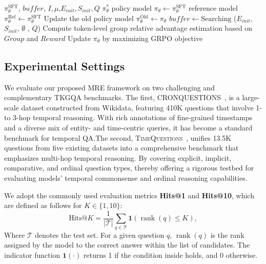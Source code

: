 \documentclass[letterpaper]{article} %
\begin{document}
\begin{algorithm}
\caption{Single sample in Tree-Group Relative Policy Optimization}
\label{alg:Train-TGRPO}
\begin{algorithmic}[1]
\Require $\pi_{\theta}^\mathrm{SFT}$, $buf\!fer$, $I, \mu$,$E_{init},S_{init},Q$
\Ensure $\pi_\theta^{*}$
\State policy model $\pi_\theta \leftarrow \pi_{\theta}^\mathrm{SFT}$
\State reference model $ \pi_{\theta}^\mathrm{Ref} \leftarrow \pi_{\theta}^\mathrm{SFT}$
\State            Update the old policy model $\pi_{\theta}^\mathrm{Old}\leftarrow \pi_\theta$
 \State           $buf\!fer \gets \text{Searching}$ ($E_{init}$, $S_{init}$, $\emptyset$ , $Q$)
 \State            Compute token-level group relative advantage estimation based on $Group$ and $Reward$
  \State Update $\pi_\theta$ by maximizing GRPO objective 
 \EndFor
 \EndFor
\EndFor
\end{algorithmic}
\end{algorithm}



\subsection{Experimental Settings}
We evaluate our proposed MRE framework on two challenging and complementary TKGQA benchmarks. The first, \textsc{CRONQUESTIONS}~\cite{cronqa}, is a large-scale dataset constructed from Wikidata, featuring 410K questions that involve 1- to 3-hop temporal reasoning. With rich annotations of fine-grained timestamps and a diverse mix of entity- and time-centric queries, it has become a standard benchmark for temporal QA.The second, \textsc{TimeQuestions}~\cite{TwiRGCN}, unifies 13.5K questions from five existing datasets into a comprehensive benchmark that emphasizes multi-hop temporal reasoning. By covering explicit, implicit, comparative, and ordinal question types, thereby offering a rigorous testbed for evaluating models' temporal commonsense and ordinal reasoning capabilities.




We adopt the commonly used evaluation metrics \textbf{Hits@1} and \textbf{Hits@10}, which are defined as follows for $K \in \{1, 10\}$:
\begin{equation}
\text{Hits@}K = \frac{1}{|\mathcal{T}|} \sum_{q \in \mathcal{T}} \mathbf{1} \left( \operatorname{rank}(q) \leq K \right),
\end{equation}
Where $\mathcal{T}$ denotes the test set. For a given question $q$, $\operatorname{rank}(q)$ is the rank assigned by the model to the correct answer within the list of candidates. The indicator function $\mathbf{1}(\cdot)$ returns 1 if the condition inside holds, and 0 otherwise.
\end{document}
